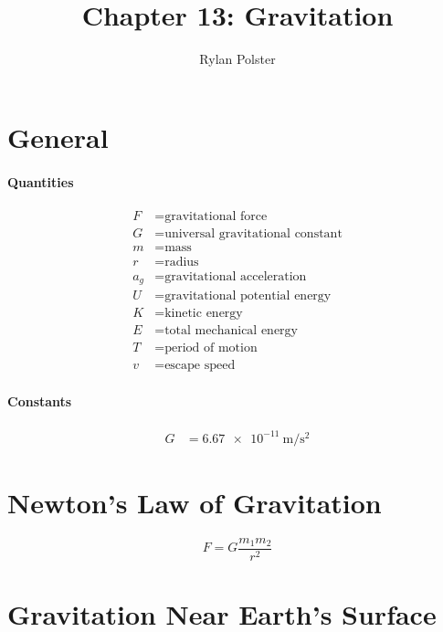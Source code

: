 \documentclass{article}
\title{Chapter 13: Gravitation}
\author{Rylan Polster}
\begin{document}
    \maketitle

    \section*{General}

        \paragraph{Quantities}
        \begin{align}
            F &= \text{gravitational force} \nonumber\\
            G &= \text{universal gravitational constant} \nonumber\\
            m &= \text{mass} \nonumber\\
            r &= \text{radius} \nonumber\\
            a_g &= \text{gravitational acceleration} \nonumber\\
            U &= \text{gravitational potential energy} \nonumber\\
            K &= \text{kinetic energy} \nonumber\\
            E &= \text{total mechanical energy} \nonumber\\
            T &= \text{period of motion} \nonumber\\
            v &= \text{escape speed} \nonumber
        \end{align}

        \paragraph{Constants}
        \begin{align}
            G &= \SI[per-mode=fraction]{6.67e-11}{\meter\per\second\squared} \nonumber
        \end{align}

    \section{Newton's Law of Gravitation}

        \begin{equation}
            F = G \frac{m_1 m_2}{r^2}
        \end{equation}

    \section{Gravitation Near Earth's Surface}
\end{document}
